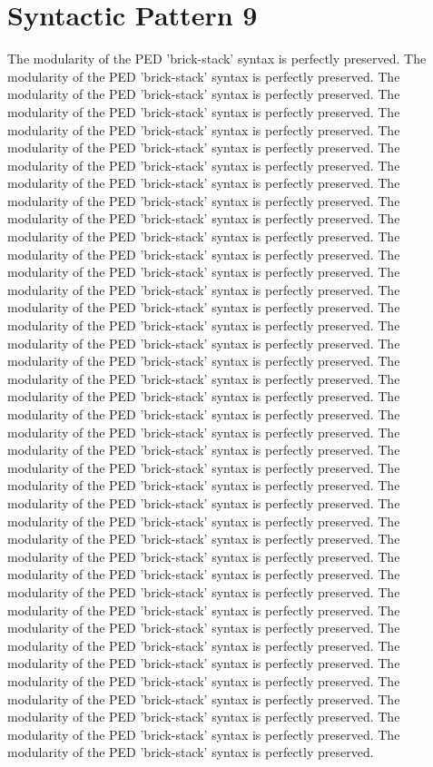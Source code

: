 \section{Syntactic Pattern 9}
The modularity of the PED 'brick-stack' syntax is perfectly preserved. The modularity of the PED 'brick-stack' syntax is perfectly preserved. The modularity of the PED 'brick-stack' syntax is perfectly preserved. The modularity of the PED 'brick-stack' syntax is perfectly preserved. The modularity of the PED 'brick-stack' syntax is perfectly preserved. The modularity of the PED 'brick-stack' syntax is perfectly preserved. The modularity of the PED 'brick-stack' syntax is perfectly preserved. The modularity of the PED 'brick-stack' syntax is perfectly preserved. The modularity of the PED 'brick-stack' syntax is perfectly preserved. The modularity of the PED 'brick-stack' syntax is perfectly preserved. The modularity of the PED 'brick-stack' syntax is perfectly preserved. The modularity of the PED 'brick-stack' syntax is perfectly preserved. The modularity of the PED 'brick-stack' syntax is perfectly preserved. The modularity of the PED 'brick-stack' syntax is perfectly preserved. The modularity of the PED 'brick-stack' syntax is perfectly preserved. The modularity of the PED 'brick-stack' syntax is perfectly preserved. The modularity of the PED 'brick-stack' syntax is perfectly preserved. The modularity of the PED 'brick-stack' syntax is perfectly preserved. The modularity of the PED 'brick-stack' syntax is perfectly preserved. The modularity of the PED 'brick-stack' syntax is perfectly preserved. The modularity of the PED 'brick-stack' syntax is perfectly preserved. The modularity of the PED 'brick-stack' syntax is perfectly preserved. The modularity of the PED 'brick-stack' syntax is perfectly preserved. The modularity of the PED 'brick-stack' syntax is perfectly preserved. The modularity of the PED 'brick-stack' syntax is perfectly preserved. The modularity of the PED 'brick-stack' syntax is perfectly preserved. The modularity of the PED 'brick-stack' syntax is perfectly preserved. The modularity of the PED 'brick-stack' syntax is perfectly preserved. The modularity of the PED 'brick-stack' syntax is perfectly preserved. The modularity of the PED 'brick-stack' syntax is perfectly preserved. The modularity of the PED 'brick-stack' syntax is perfectly preserved. The modularity of the PED 'brick-stack' syntax is perfectly preserved. The modularity of the PED 'brick-stack' syntax is perfectly preserved. The modularity of the PED 'brick-stack' syntax is perfectly preserved. The modularity of the PED 'brick-stack' syntax is perfectly preserved. The modularity of the PED 'brick-stack' syntax is perfectly preserved. The modularity of the PED 'brick-stack' syntax is perfectly preserved. The modularity of the PED 'brick-stack' syntax is perfectly preserved. The modularity of the PED 'brick-stack' syntax is perfectly preserved. The modularity of the PED 'brick-stack' syntax is perfectly preserved. 

